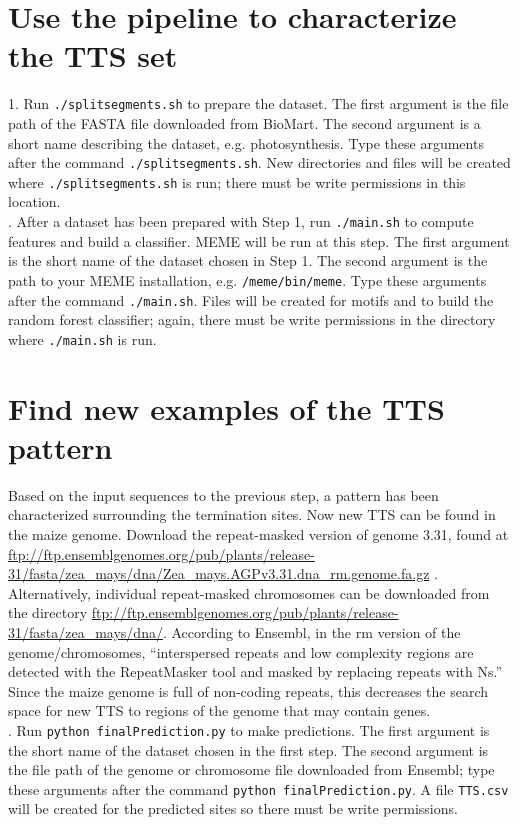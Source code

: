 \documentclass[12pt,letterpaper]{report}
\begin{document}
\section*{Use the pipeline to characterize the TTS set}
1. \indent Run \texttt{./splitsegments.sh} to prepare the dataset. The first argument is the file path of the FASTA file downloaded from BioMart. The second argument is a short name describing the dataset, e.g. photosynthesis. Type these arguments after the command \texttt{./splitsegments.sh}. New directories and files will be created where \texttt{./splitsegments.sh} is run; there must be write permissions in this location.\\

. \indent After a dataset has been prepared with Step 1, run \texttt{./main.sh} to compute features and build a classifier. MEME will be run at this step. The first argument is the short name of the dataset chosen in Step 1. The second argument is the path to your MEME installation, e.g. \texttt{/meme/bin/meme}. Type these arguments after the command \texttt{./main.sh}. Files will be created for motifs and to build the random forest classifier; again, there must be write permissions in the directory where \texttt{./main.sh} is run. 

\section*{\large Find new examples of the TTS pattern}
Based on the input sequences to the previous step, a pattern has been characterized surrounding the termination sites. Now new TTS can be found in the maize genome. Download the repeat-masked version of genome 3.31, found at \url{ftp://ftp.ensemblgenomes.org/pub/plants/release-31/fasta/zea_mays/dna/Zea_mays.AGPv3.31.dna_rm.genome.fa.gz} \cite{maize}. Alternatively, individual repeat-masked chromosomes can be downloaded from the directory \url{ftp://ftp.ensemblgenomes.org/pub/plants/release-31/fasta/zea_mays/dna/}. According to Ensembl, in the rm version of the genome/chromosomes, ``interspersed repeats and low complexity regions are detected with the RepeatMasker tool and masked by replacing repeats with Ns.'' Since the maize genome is full of non-coding repeats, this decreases the search space for new TTS to regions of the genome that may contain genes.\\
. \indent Run \texttt{python finalPrediction.py} to make predictions. The first argument is the short name of the dataset chosen in the first step. The second argument is the file path of the genome or chromosome file downloaded from Ensembl; type these arguments after the command \texttt{python finalPrediction.py}. A file \texttt{TTS.csv} will be created for the predicted sites so there must be write permissions.
\end{document}
